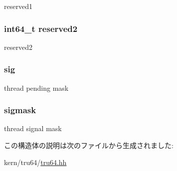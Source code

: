 reserved1 \hypertarget{structTru64_1_1ushared__state_ac962a352ad5618348c3871ef54b4d2ee}{
\subsubsection[{reserved2}]{\setlength{\rightskip}{0pt plus 5cm}int64\_\-t {\bf reserved2}}}
\label{structTru64_1_1ushared__state_ac962a352ad5618348c3871ef54b4d2ee}


reserved2 \hypertarget{structTru64_1_1ushared__state_a9c53d1e3c0bc3d8be6911f0f232a7079}{
\subsubsection[{sig}]{ {\bf sig}}}
\label{structTru64_1_1ushared__state_a9c53d1e3c0bc3d8be6911f0f232a7079}


thread pending mask \hypertarget{structTru64_1_1ushared__state_a84a273d642c19957017a87b1f54031e6}{
\subsubsection[{sigmask}]{ {\bf sigmask}}}
\label{structTru64_1_1ushared__state_a84a273d642c19957017a87b1f54031e6}


thread signal mask 

この構造体の説明は次のファイルから生成されました:\begin{DoxyCompactItemize}
\item 
kern/tru64/\hyperlink{kern_2tru64_2tru64_8hh}{tru64.hh}\end{DoxyCompactItemize}
